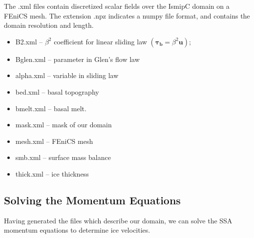 \documentclass[11pt, reqno, nocenter]{article}
\begin{document}

The .xml files contain discretized scalar fields over the IsmipC domain on a FEniCS mesh. The extension .npz indicates a numpy file format, and contains the domain resolution and length.

\begin{itemize}
\item B2.xml -- $\beta^2$ coefficient for linear sliding law $( = \beta^2 )$;
\item  Bglen.xml -- parameter in Glen's flow law
\item alpha.xml -- variable in sliding law 
\item bed.xml -- basal topography
\item bmelt.xml -- basal melt. 
\item mask.xml -- mask of our domain
\item mesh.xml -- FEniCS mesh
\item smb.xml -- surface mass balance
\item thick.xml -- ice thickness

\end{itemize}

\subsection{Solving the Momentum Equations}

Having generated the files which describe our domain, we can solve the SSA momentum equations to determine ice velocities. 
\end{document}

